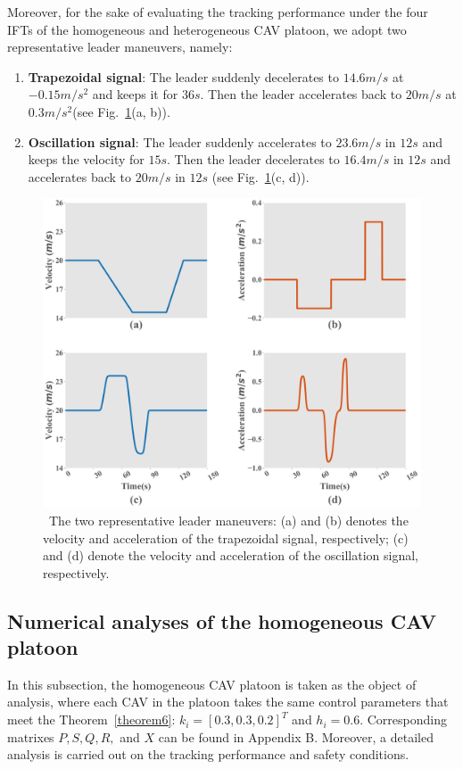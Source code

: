 \documentclass[a4paper]{cas-sc}
\begin{document}
Moreover, for the sake of evaluating the tracking performance under the four IFTs of the homogeneous and heterogeneous CAV platoon, we adopt two representative leader maneuvers, namely:
\begin{enumerate}
  \item \textbf{Trapezoidal signal}: The leader suddenly decelerates to $14.6m/s$ at $ - 0.15m/{s^2}$ and keeps it for $36s$. Then the leader accelerates back to $20m/s$ at $ 0.3m/{s^2} $(see Fig.~\ref{fig3}(a, b)).
  \item \textbf{Oscillation signal}: The leader suddenly accelerates to $23.6m/s$ in $12s$ and keeps the velocity for $15s$. Then the leader decelerates to $16.4m/s$ in $12s$ and accelerates back to $20m/s$ in $12s$ (see Fig.~\ref{fig3}(c, d)).
\end{enumerate}

\begin{figure}

  \centering
  \includegraphics[width=14cm]{figs/fig3.png}
  \caption{~The two representative leader maneuvers: (a) and (b) denotes the velocity and acceleration of the trapezoidal signal, respectively; (c) and (d) denote the velocity and acceleration of the oscillation signal, respectively.}
  \label{fig3}

\end{figure}


\subsection{Numerical analyses of the homogeneous CAV platoon}
\label{Section 5.2}
In this subsection, the homogeneous CAV platoon is taken as the object of analysis, where each CAV in the platoon takes the same control parameters that meet the Theorem~\ref{theorem6}: $ {k_i} = {[0.3,0.3,0.2]^T} $ and $ {h_i} = 0.6 $. Corresponding matrixes $ P,S,Q,R, $ and $X$ can be found in Appendix B. Moreover, a detailed analysis is carried out on the tracking performance and safety conditions.
\end{document}
